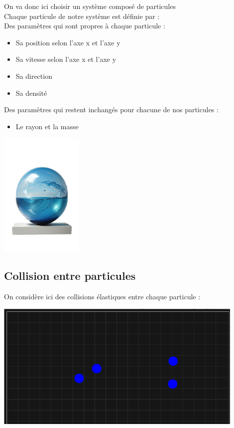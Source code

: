 \documentclass{article}
\begin{document}
\newpage
\vspace*{2pt}
\thispagestyle{landscape}
\parbox{0.7\textwidth}{
On va donc ici choisir un système composé de particules
\\Chaque particule  de notre système est définie par : 
\\Des paramètres qui sont propres à chaque particule :
\begin{itemize}
    \item Sa position selon l’axe x et l’axe y
    \item Sa vitesse selon l’axe x et l’axe y
    \item Sa direction 
    \item Sa densité
\end{itemize}


Des paramètres qui restent inchangés pour chacune de nos particules : 
\begin{itemize}
    \item Le rayon et la masse
\end{itemize}
}
\parbox{0.3\textwidth}{
    \includegraphics[width=0.3\textwidth]{particule}
}
\vspace*{\fill}

\newpage
\vspace*{2pt}
\thispagestyle{landscape}
\subsection{Collision entre particules}
On considère ici des collisions élastiques entre chaque particule : 
\begin{center}
    \includegraphics[width=0.9\textwidth]{CollisionP1.png}
\end{center}
\end{document}

